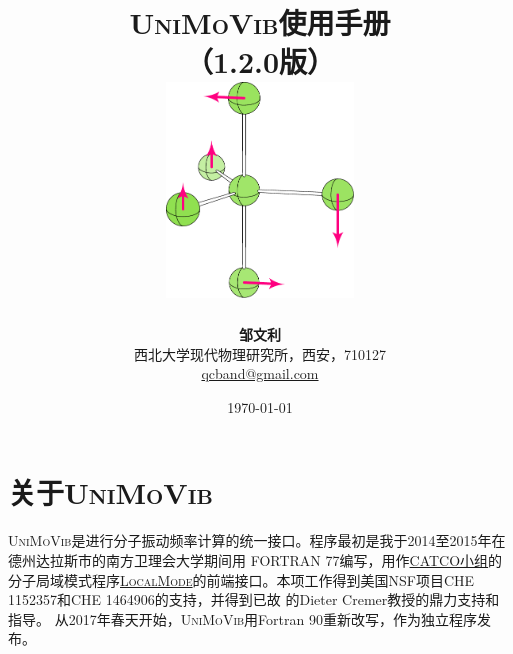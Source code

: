 \documentclass[12pt,a4paper,openany,twoside,cap]{ctexbook}
\begin{document}

\title{
\vspace{-3cm}
\hei\textsc{UniMoVib}使用手册  \\
\vspace{1cm} （1.2.0版）\vspace{30 mm} \\
\includegraphics[width=50.0mm]{fig/logo} \vspace{30 mm}}

\author{
\textbf{邹文利} \\ \vspace{5mm}
西北大学现代物理研究所，西安，710127 \\ \vspace{5mm}
\href{mailto:qcband@gmail.com}{qcband@gmail.com}
}

\date{\vspace{1cm}  \today}
\maketitle

\setcounter{page}{1}   %
\renewcommand\contentsname{目\qquad 录}
\makeatletter
\let\ps@plain\ps@empty
\makeatother
\tableofcontents            %

\mainmatter
\chapter{关于\textsc{UniMoVib}}
\label{part:about}

\textsc{UniMoVib}是进行分子振动频率计算的统一接口。程序最初是我于2014至2015年在德州达拉斯市的南方卫理会大学期间用 FORTRAN 77编写，用作\href{https://sites.smu.edu/dedman/catco/}{CATCO小组}的分子局域模式程序\href{https://github.com/catco-smu}{\textsc{LocalMode}}的前端接口。本项工作得到美国NSF项目CHE 1152357和CHE 1464906的支持，并得到已故 的Dieter Cremer教授的鼎力支持和指导。
从2017年春天开始，\textsc{UniMoVib}用Fortran 90重新改写，作为独立程序发布。
\end{document}
